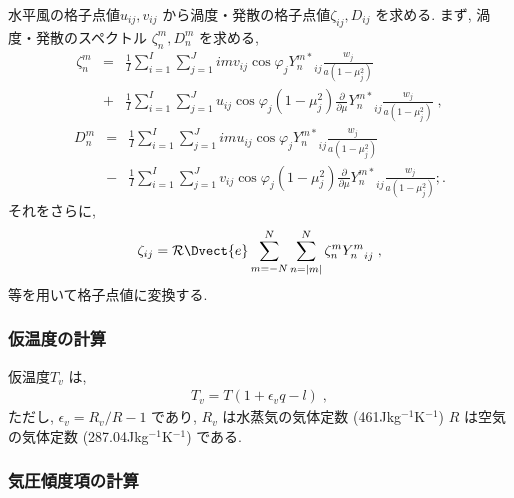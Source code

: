 水平風の格子点値$u_{ij}, v_{ij}$ 
から渦度・発散の格子点値$\zeta_{ij}, D_{ij}$ を求める.
まず, 渦度・発散のスペクトル
$\zeta_n^m, D_n^m$ を求める,
\begin{eqnarray}
\zeta_n^m & = & \frac{1}{I} \sum_{i=1}^{I} \sum_{j=1}^{J}  
                  im v_{ij} \cos\varphi_j {Y_n^{m*}}_{ij}
                \frac{w_j}{a(1-\mu_j^{2})} 
                \nonumber \\
          & + &   \frac{1}{I} \sum_{i=1}^{I} \sum_{j=1}^{J}  
                     u_{ij} \cos\varphi_j (1-\mu_j^2) 
                  \frac{\partial }{\partial \mu} {Y_n^{m*}}_{ij}
                 \frac{w_j}{a(1-\mu_j^{2})} \; ,
\label{d-summ:uv-zeta}                 
\end{eqnarray}
\begin{eqnarray}
    D_n^m & = & \frac{1}{I} \sum_{i=1}^{I} \sum_{j=1}^{J}  
                  im u_{ij} \cos\varphi_j {Y_n^{m*}}_{ij}
                \frac{w_j}{a(1-\mu_j^{2})} 
                \nonumber \\
          & - &   \frac{1}{I} \sum_{i=1}^{I} \sum_{j=1}^{J}  
                  v_{ij} \cos\varphi_j  (1-\mu_j^2) 
                  \frac{\partial }{\partial \mu} {Y_n^{m*}}_{ij}
                 \frac{w_j}{a(1-\mu_j^{2})} ; .
\label{d-summ:uv-D}                 
\end{eqnarray}
それをさらに, 
\begin{equation}
  \zeta_{ij} 
   =  {\cal R}\Dvect{e} \sum_{m=-N}^{N} \sum_{n=|m|}^{N} 
      \zeta_n^m  {Y_n^m}_{ij} \; ,
\end{equation}
等を用いて格子点値に変換する.

\subsubsection{仮温度の計算}

仮温度$T_v$ は, 
\begin{eqnarray}
  T_v = T ( 1 + \epsilon_v q - l ) \; ,
\end{eqnarray}
ただし, $\epsilon_v = R_v/R - 1$ であり, 
$R_v$ は水蒸気の気体定数
(461Jkg$^{-1}$K$^{-1}$)
$R$ は空気の気体定数
(287.04Jkg$^{-1}$K$^{-1}$)
である.

\subsubsection{気圧傾度項の計算}

